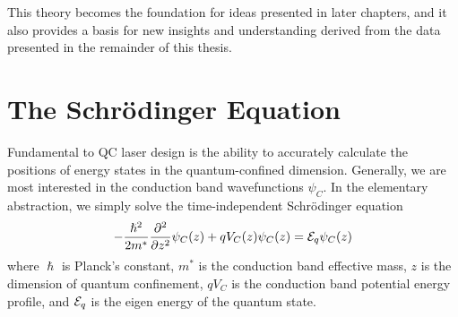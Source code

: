 \documentclass[12pt]{report}
\begin{document}
This theory becomes the foundation for ideas presented in later chapters, and it also provides a basis for new insights and understanding derived from the data presented in the remainder of this thesis.



%
%
%
%
%

\section{The Schr\"{o}dinger Equation}

Fundamental to QC laser design is the ability to accurately calculate the positions of energy states in the quantum-confined dimension.  Generally, we are most interested in the conduction band wavefunctions $\psi_C$.  In the elementary abstraction, we simply solve the time-independent Schr\"{o}dinger equation
\begin{equation}
\label{chpt1eqn:SEq_0}
-\frac{\hslash^2}{2m^*} \frac{\partial^2}{\partial z^2}\psi_C(z) + q V_C(z) \psi_C(z) = \EE_q \psi_C(z)
\end{equation}
where $\hslash$ is Planck's constant, $m^*$ is the conduction band effective mass, $z$ is the dimension of quantum confinement, $q V_C$ is the conduction band potential energy profile, and $\EE_q$ is the eigen energy of the quantum state.
\end{document}
